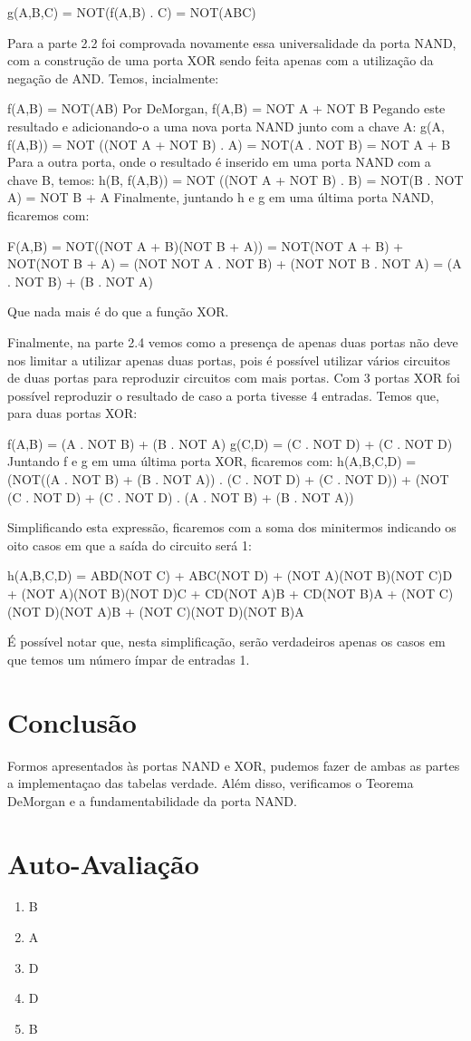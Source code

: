 \documentclass[12pt]{article}
\begin{document}
g(A,B,C) = NOT(f(A,B) . C) = NOT(ABC)

Para a parte 2.2 foi comprovada novamente essa universalidade da porta NAND, com a construção de uma porta XOR sendo feita apenas com a utilização da negação de AND. Temos, incialmente:

f(A,B) = NOT(AB) 
Por DeMorgan, f(A,B) = NOT A + NOT B 
Pegando este resultado e adicionando-o a uma nova porta NAND junto com a chave A:
g(A, f(A,B)) = NOT ((NOT A + NOT B) . A) = NOT(A . NOT B) = NOT A + B
Para a outra porta, onde o resultado é inserido em uma porta NAND com a chave B, temos:
h(B, f(A,B)) = NOT ((NOT A + NOT B) . B) = NOT(B . NOT A) = NOT B + A
Finalmente, juntando h e g em uma última porta NAND, ficaremos com:

F(A,B) = NOT((NOT A + B)(NOT B + A)) = NOT(NOT A + B) + NOT(NOT B + A)
= (NOT NOT A . NOT B) + (NOT NOT B . NOT A) = (A . NOT B) + (B . NOT A)

Que nada mais é do que a função XOR. 

Finalmente, na parte 2.4 vemos como a presença de apenas duas portas não deve nos limitar a utilizar apenas duas portas, pois é possível utilizar vários circuitos de duas portas para reproduzir circuitos com mais portas. Com 3 portas XOR foi possível reproduzir o resultado de caso a porta tivesse 4 entradas. Temos que, para duas portas XOR:

f(A,B) = (A . NOT B) + (B . NOT A)
g(C,D) = (C . NOT D) + (C . NOT D)
Juntando f e g em uma última porta XOR, ficaremos com:
h(A,B,C,D) = (NOT((A . NOT B) + (B . NOT A)) .  (C . NOT D) + (C . NOT D)) + (NOT  (C . NOT D) + (C . NOT D) .  (A . NOT B) + (B . NOT A))

Simplificando esta expressão, ficaremos com a soma dos minitermos indicando os oito casos em que a saída do circuito será 1:

h(A,B,C,D) = ABD(NOT C) + ABC(NOT D) + (NOT A)(NOT B)(NOT C)D + (NOT A)(NOT B)(NOT D)C + CD(NOT A)B + CD(NOT B)A + (NOT C)(NOT D)(NOT A)B + (NOT C)(NOT D)(NOT B)A

É possível notar que, nesta simplificação, serão verdadeiros apenas os casos em que temos um número ímpar de entradas 1.


\section{Conclusão}
\label{sec:Conclusao}

Formos apresentados às portas NAND e XOR, pudemos fazer de ambas as partes a implementaçao das tabelas verdade. Além disso, verificamos o Teorema DeMorgan e a fundamentabilidade da porta NAND.







\newpage 
\section*{Auto-Avaliação}

\begin{enumerate}
    \item B
    \item A
    \item D
    \item D
    \item B
\end{enumerate}
\end{document}

